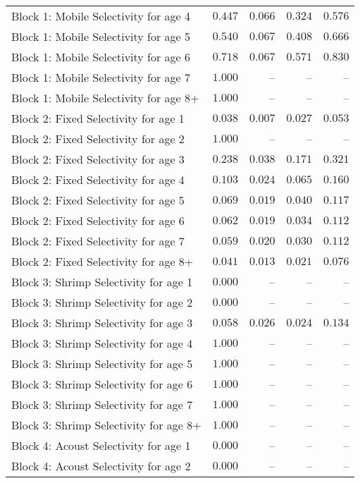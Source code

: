 \documentclass[
]{article}
\begin{document}
\begin{landscape}
\begin{longtable}[t]{lrrrr}
Block 1: Mobile Selectivity for age 4 & $0.447$ & $0.066$ & $0.324$ & $0.576$\\
Block 1: Mobile Selectivity for age 5 & $0.540$ & $0.067$ & $0.408$ & $0.666$\\
\addlinespace
Block 1: Mobile Selectivity for age 6 & $0.718$ & $0.067$ & $0.571$ & $0.830$\\
Block 1: Mobile Selectivity for age 7 & $1.000$ & -- & -- & --\\
Block 1: Mobile Selectivity for age 8+ & $1.000$ & -- & -- & --\\
Block 2: Fixed Selectivity for age 1 & $0.038$ & $0.007$ & $0.027$ & $0.053$\\
Block 2: Fixed Selectivity for age 2 & $1.000$ & -- & -- & --\\
\addlinespace
Block 2: Fixed Selectivity for age 3 & $0.238$ & $0.038$ & $0.171$ & $0.321$\\
Block 2: Fixed Selectivity for age 4 & $0.103$ & $0.024$ & $0.065$ & $0.160$\\
Block 2: Fixed Selectivity for age 5 & $0.069$ & $0.019$ & $0.040$ & $0.117$\\
Block 2: Fixed Selectivity for age 6 & $0.062$ & $0.019$ & $0.034$ & $0.112$\\
Block 2: Fixed Selectivity for age 7 & $0.059$ & $0.020$ & $0.030$ & $0.112$\\
\addlinespace
Block 2: Fixed Selectivity for age 8+ & $0.041$ & $0.013$ & $0.021$ & $0.076$\\
Block 3: Shrimp Selectivity for age 1 & $0.000$ & -- & -- & --\\
Block 3: Shrimp Selectivity for age 2 & $0.000$ & -- & -- & --\\
Block 3: Shrimp Selectivity for age 3 & $0.058$ & $0.026$ & $0.024$ & $0.134$\\
Block 3: Shrimp Selectivity for age 4 & $1.000$ & -- & -- & --\\
\addlinespace
Block 3: Shrimp Selectivity for age 5 & $1.000$ & -- & -- & --\\
Block 3: Shrimp Selectivity for age 6 & $1.000$ & -- & -- & --\\
Block 3: Shrimp Selectivity for age 7 & $1.000$ & -- & -- & --\\
Block 3: Shrimp Selectivity for age 8+ & $1.000$ & -- & -- & --\\
Block 4: Acoust Selectivity for age 1 & $0.000$ & -- & -- & --\\
\addlinespace
Block 4: Acoust Selectivity for age 2 & $0.000$ & -- & -- & --\\

\end{longtable}
\end{landscape}
\end{document}
